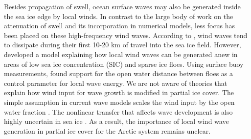 \documentclass [11pt, proquest] {uwthesis}[2020/02/24]
\begin{document}


Besides propagation of swell, ocean surface waves may also be generated inside the sea ice edge by local winds. In contrast to the large body of work on the attenuation of swell and its incorporation in numerical models, less focus has been placed on these high-frequency wind waves. According to \cite{Squire1980}, wind waves tend to dissipate during their first 10-20 km of travel into the sea ice field. However, \cite{Masson1989SpectralField} developed a model explaining how local wind waves can be generated anew in areas of low sea ice concentration (SIC) and sparse ice floes. Using surface buoy measurements, \cite{Smith2016} found support for the open water distance between floes as a control parameter for local wave energy. We are not aware of theories that explain how wind input for wave growth is modified in partial ice cover. The simple assumption in current wave models scales the wind input by the open water fraction \cite{Liu2020SpectralDecay}. The nonlinear transfer that affects wave development is also highly uncertain in sea ice \cite{Rogers2016DissipationSea, Polnikov2007CalculationIce}. As a result, the importance of local wind wave generation in partial ice cover for the Arctic system remains unclear.  
\end{document}
